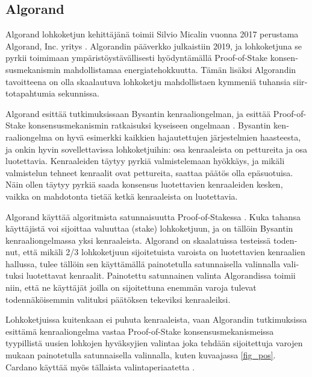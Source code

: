 \subsection{Algorand\label{algorand0}}
\begin{otherlanguage}{english}

Algorand lohkoketjun kehittäjänä toimii Silvio Micalin vuonna 2017 perustama Algorand, Inc. yritys \cite{algorandwhitepaper}. Algorandin pääverkko julkaistiin 2019, ja lohkoketjuna se pyrkii toimimaan ympäristöystävällisesti hyödyntämällä Proof-of-Stake konsensusmekanismin mahdollistamaa energiatehokkuutta. Tämän lisäksi Algorandin tavoitteena on olla skaalautuva lohkoketju mahdollistaen kymmeniä tuhansia siirtotapahtumia sekunnissa.

Algorand esittää tutkimuksissaan Bysantin kenraaliongelman, ja esittää Proof-of-Stake konsensusmekanismin ratkaisuksi kyseiseen ongelmaan \cite{algorandtech}. Bysantin kenraaliongelma on hyvä esimerkki kaikkien hajautettujen järjestelmien haasteesta, ja onkin hyvin sovellettavissa lohkoketjuihin: osa kenraaleista on pettureita ja osa luotettavia. Kenraaleiden täytyy pyrkiä valmistelemaan hyökkäys, ja mikäli valmistelun tehneet kenraalit ovat pettureita, saattaa päätös olla epäsuotuisa. Näin ollen täytyy pyrkiä saada konsensus luotettavien kenraaleiden kesken, vaikka on mahdotonta tietää ketkä kenraaleista on luotettavia.

Algorand käyttää algoritmista satunnaisuutta Proof-of-Stakessa \cite{algorandtech}. Kuka tahansa käyttäjistä voi sijoittaa valuuttaa (stake) lohkoketjuun, ja on tällöin Bysantin kenraaliongelmassa yksi kenraaleista. Algorand on skaalatuissa testeissä todennut, että mikäli 2/3 lohkoketjuun sijoitetuista varoista on luotettavien kenraalien hallussa, tulee tällöin sen käyttämällä painotetulla satunnaisella valinnalla valituksi luotettavat kenraalit. Painotettu satunnainen valinta Algorandissa toimii niin, että ne käyttäjät joilla on sijoitettuna enemmän varoja tulevat todennäköisemmin valituksi päätöksen tekeviksi kenraaleiksi.

Lohkoketjuissa kuitenkaan ei puhuta kenraaleista, vaan Algorandin tutkimuksissa esittämä kenraaliongelma vastaa Proof-of-Stake konsensusmekanismeissa tyypillistä uusien lohkojen hyväksyjien valintaa joka tehdään sijoitettuja varojen mukaan painotetulla satunnaisella valinnalla, kuten kuvaajassa \ref{fig_pos}. Cardano käyttää myös tällaista valintaperiaatetta \cite{cardanowhitepaper}.


\end{otherlanguage}
